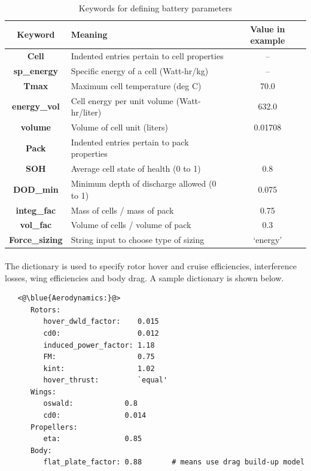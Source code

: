 \begin{center}
  \begin{table}[H]
	\caption{Keywords for defining battery parameters}
	\label{tbl:battery_keywords}
    \begin{tabular}{| c | l | c |}
    \hline
    Keyword & Meaning & Value in example \\ 
    \hline
\textbf{Cell} & Indented entries pertain to cell properties &  -- \\
\textbf{sp\_energy} & Specific energy of a cell (Watt-hr/kg) &  -- \\
\textbf{Tmax} & Maximum cell temperature (deg C) & 70.0 \\
\textbf{energy\_vol} & Cell energy per unit volume (Watt-hr/liter) & 632.0 \\
\textbf{volume} & Volume of cell unit (liters) & 0.01708 \\
\textbf{Pack} & Indented entries pertain to pack properties &  \\
\textbf{SOH} & Average cell state of health (0 to 1) & 0.8 \\
\textbf{DOD\_min} & Minimum depth of discharge allowed (0 to 1) & 0.075 \\
\textbf{integ\_fac} & Mass of cells / mass of pack & 0.75 \\
\textbf{vol\_fac} & Volume of cells / volume of pack & 0.3 \\
\textbf{Force\_sizing} & String input to choose type of sizing & `energy' \\
     \hline
  \end{tabular}
\end{table}
\end{center}
\vspace{-1cm}

\paragraph{}
The  dictionary is used to specify rotor hover and cruise efficiencies, interference losses, wing efficiencies and body drag. A sample dictionary is shown below.

\begin{lstlisting}
   <@\blue{Aerodynamics:}@>
      Rotors:
         hover_dwld_factor:    0.015
         cd0:                  0.012
         induced_power_factor: 1.18
         FM:                   0.75
         kint:                 1.02
         hover_thrust:         `equal'
      Wings:
         oswald:            0.8
         cd0:               0.014
      Propellers:
         eta:               0.85
      Body:
         flat_plate_factor: 0.88       # means use drag build-up model
\end{lstlisting}

